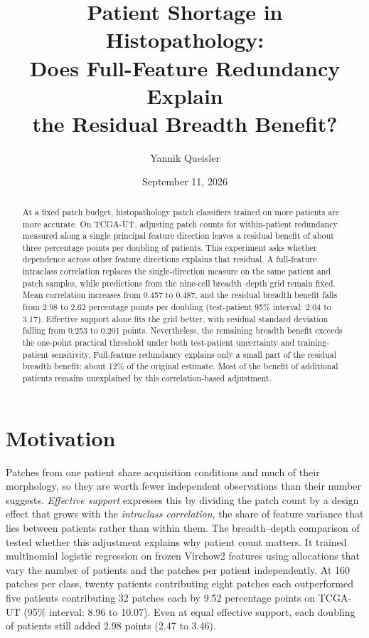 \documentclass[11pt]{article}
\title{Patient Shortage in Histopathology:\\Does Full-Feature Redundancy Explain\\the Residual Breadth Benefit?}
\author{Yannik Queisler}
\date{September 11, 2026}
\begin{document}
\raggedbottom
{}
\setlength{\emergencystretch}{2em}
\maketitle
\begin{abstract}
\noindent At a fixed patch budget, histopathology patch classifiers trained on more patients are more accurate. On TCGA-UT, adjusting patch counts for within-patient redundancy measured along a single principal feature direction leaves a residual benefit of about three percentage points per doubling of patients. This experiment asks whether dependence across other feature directions explains that residual. A full-feature intraclass correlation replaces the single-direction measure on the same patient and patch samples, while predictions from the nine-cell breadth--depth grid remain fixed. Mean correlation increases from 0.457 to 0.487, and the residual breadth benefit falls from 2.98 to 2.62 percentage points per doubling (test-patient 95\% interval: 2.04 to 3.17). Effective support alone fits the grid better, with residual standard deviation falling from 0.253 to 0.201 points. Nevertheless, the remaining breadth benefit exceeds the one-point practical threshold under both test-patient uncertainty and training-patient sensitivity. Full-feature redundancy explains only a small part of the residual breadth benefit: about 12\% of the original estimate. Most of the benefit of additional patients remains unexplained by this correlation-based adjustment.
\end{abstract}
\setcounter{tocdepth}{1}
\tableofcontents
\clearpage

\section{Motivation}
\label{sec:motivation}
Patches from one patient share acquisition conditions and much of their morphology, so they are worth fewer independent observations than their number suggests. \emph{Effective support} expresses this by dividing the patch count by a design effect that grows with the \emph{intraclass correlation}, the share of feature variance that lies between patients rather than within them. The breadth--depth comparison of \citet{queisler2026effectiveSupport} tested whether this adjustment explains why patient count matters. It trained multinomial logistic regression on frozen Virchow2 features using allocations that vary the number of patients and the patches per patient independently. At 160 patches per class, twenty patients contributing eight patches each outperformed five patients contributing 32 patches each by 9.52 percentage points on TCGA-UT (95\% interval: 8.96 to 10.07). Even at equal effective support, each doubling of patients still added 2.98 points (2.47 to 3.46).
\end{document}
